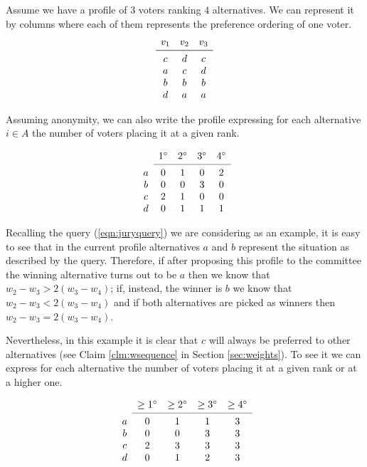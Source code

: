 Assume we have a profile of $3$ voters ranking $4$ alternatives. We can represent it by columns where each of them represents the preference ordering of one voter.
\[
\begin{array}{ccc}
v_1
& v_2
& v_3 \\
\midrule 
c
& d
& c \\
a
& c
& d \\
b
& b
& b \\
d
& a
& a \\
\end{array}
\]

Assuming anonymity, we can also write the profile expressing for each alternative $i \in A$ the number of voters placing it at a given rank.

\[
\begin{array}{ccccc}
& 1^\circ
& 2^\circ
& 3^\circ
& 4^\circ \\
\cmidrule{2-5}
a 
& 0
& 1
& 0
& 2 \\
b
& 0
& 0
& 3
& 0 \\
c
& 2
& 1
& 0
& 0 \\
d
& 0
& 1
& 1
& 1 \\
\end{array}
\]

Recalling the query (\ref{eqn:juryquery}) we are considering as an example, it is easy to see that in the current profile alternatives $a$ and $b$ represent the situation as described by the query. Therefore, if after proposing this profile to the committee the winning alternative turns out to be $a$ then we know that $w_{2} - w_{3} > 2(w_{3} - w_{4})$; if, instead, the winner is $b$ we know that $w_{2} - w_{3} < 2(w_{3} - w_{4})$ and if both alternatives are picked as winners then $w_{2} - w_{3} = 2(w_{3} - w_{4})$. 

Nevertheless, in this example it is clear that $c$ will always be preferred to other alternatives (see Claim \ref{clm:wsequence} in Section \ref{sec:weights}). To see it we can express for each alternative the number of voters placing it at a given rank or at a higher one.

\[
\begin{array}{ccccc}
& \geq 1^\circ
& \geq 2^\circ
& \geq 3^\circ
& \geq 4^\circ \\
\cmidrule{2-5}
a 
& 0
& 1
& 1
& 3 \\
b
& 0
& 0
& 3
& 3 \\
c
& 2
& 3
& 3
& 3 \\
d
& 0
& 1
& 2
& 3 \\
\end{array}
\]


